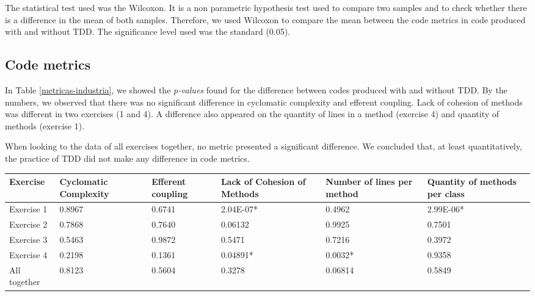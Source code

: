\documentclass[conference]{IEEEtran}
\begin{document}
The statistical test used was the Wilcoxon. It is a non parametric hypothesis test
used to compare two samples and to check whether there is a difference in the mean
of both samples. Therefore, we used Wilcoxon to compare the mean between
the code metrics in code produced with and without TDD. The significance level
used was the standard (0.05).


\subsection{Code metrics}

In Table \ref{metricas-industria}, we showed the \textit{p-values} found for
the difference between codes produced with and without TDD. By the numbers,
we observed that there was no significant difference in cyclomatic complexity
and efferent coupling.
Lack of cohesion of methods was different in two exercises (1 and 4). A difference
also appeared on the quantity of lines in a method (exercise 4) and quantity of
methods (exercise 1).

When looking to the data of all exercises together, no metric presented a significant
difference. We concluded that, at least quantitatively, the practice of TDD did not
make any difference in code metrics.

\begin{table*}
	\centering
	\begin{tabular}{ | p{3cm} | p{2cm} | p{2cm} | p{2cm} | p{2cm} | p{2cm} |}
		\hline
		\textbf{Exercise} & \textbf{Cyclomatic Complexity} & \textbf{Efferent coupling} & \textbf{Lack of Cohesion of Methods} & \textbf{Number of lines per method} 
		& \textbf{Quantity of methods per class} \\
		\hline
		Exercise 1 &	0.8967	&	0.6741 &	\cellcolor[gray]{0.8}2.04E-07* &	0.4962 &	\cellcolor[gray]{0.8}2.99E-06* \\
		Exercise 2	& 0.7868	&	0.7640 &	0.06132 &	0.9925 &	0.7501 \\
		Exercise 3	& 0.5463	&	0.9872 &	0.5471 &	0.7216 &	0.3972\\
		Exercise 4	& 0.2198	&	0.1361 &	\cellcolor[gray]{0.8}0.04891* &	\cellcolor[gray]{0.8}0.0032* &	0.9358\\
		\hline
		All together &	0.8123	&	0.5604 &	0.3278 &	0.06814 &	0.5849\\
		\hline
	\end{tabular}
	\caption{\textit{P-values} found for the difference between code produced with and without TDD}
	\label{metricas-industria}
\end{table*}
\end{document}

